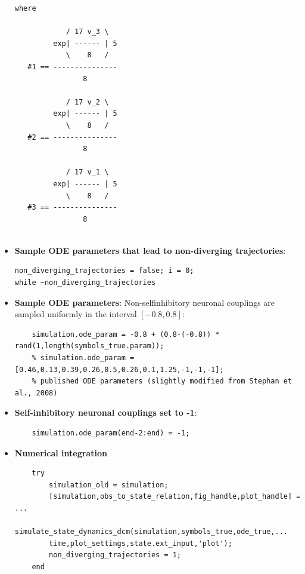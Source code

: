 \begin{itemize}
{\begin{verbatim}
where

            / 17 v_3 \
         exp| ------ | 5
            \    8   /
   #1 == ---------------
                8

            / 17 v_2 \
         exp| ------ | 5
            \    8   /
   #2 == ---------------
                8

            / 17 v_1 \
         exp| ------ | 5
            \    8   /
   #3 == ---------------
                8


\end{verbatim} 
\color{black} 

}

\item \textbf{Sample ODE parameters that lead to non-diverging trajectories}:

\color{RoyalPurple}\begin{verbatim}
non_diverging_trajectories = false; i = 0;
while ~non_diverging_trajectories
\end{verbatim} 
\color{black}

   \item \textbf{Sample ODE parameters}: Non-selfinhibitory neuronal couplings are sampled uniformly in the interval $[-0.8,0.8]$:
    \color{RoyalPurple}\begin{verbatim}
    simulation.ode_param = -0.8 + (0.8-(-0.8)) * rand(1,length(symbols_true.param));
    % simulation.ode_param = [0.46,0.13,0.39,0.26,0.5,0.26,0.1,1.25,-1,-1,-1];       
    % published ODE parameters (slightly modified from Stephan et al., 2008)
\end{verbatim} 
\color{black}

\item \textbf{Self-inhibitory neuronal couplings set to -1}:
    \color{RoyalPurple}\begin{verbatim}
    simulation.ode_param(end-2:end) = -1;
\end{verbatim} 
\color{black}

   \item \textbf{Numerical integration}

\color{RoyalPurple}\begin{verbatim}
    try
        simulation_old = simulation;
        [simulation,obs_to_state_relation,fig_handle,plot_handle] = ...
        simulate_state_dynamics_dcm(simulation,symbols_true,ode_true,...
        time,plot_settings,state.ext_input,'plot');
        non_diverging_trajectories = 1;
    end
\end{verbatim} 
\color{black}
\end{itemize}

